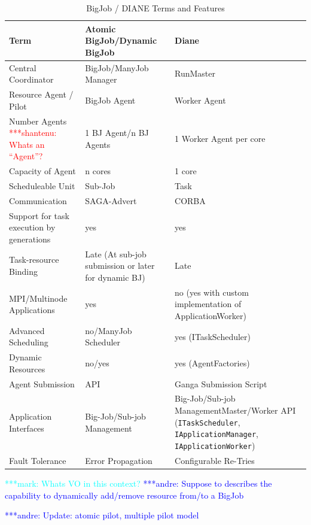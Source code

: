 \documentclass[conference,final]{IEEEtran}
\newcommand{\jhanote}[1]{ {\textcolor{red} { ***shantenu: #1 }}}
\newcommand{\alnote}[1]{ {\textcolor{blue} { ***andre: #1 }}}
\newcommand{\msnote}[1]{ {\textcolor{cyan} { ***mark: #1 }}}
\newcommand{\alnote}[1]{}
\newcommand{\jhanote}[1]{}
\begin{document}
\begin{table}[t]
\centering
\begin{tabular}{|p{3.5cm}|p{5.9cm}|p{5.7cm}|}
\hline
\textbf{Term} &\textbf{Atomic BigJob/Dynamic BigJob} &\textbf{Diane}  \\
\hline
Central Coordinator &BigJob/ManyJob Manager & RunMaster \\ 
\hline
Resource Agent / Pilot &BigJob Agent  & Worker Agent \\
\hline
Number Agents \jhanote{Whats an ``Agent''?}  &1 BJ Agent/n BJ Agents & 1 Worker Agent per core \\
\hline
Capacity of Agent &n cores & 1 core\\
\hline
Scheduleable Unit&Sub-Job &  Task \\
\hline
Communication &SAGA-Advert & CORBA\\
\hline
Support for task execution by generations  &yes &yes\\  
\hline
Task-resource Binding &Late (At sub-job submission or later for dynamic BJ) &Late\\
\hline
MPI/Multinode Applications &yes &no (yes with custom implementation of ApplicationWorker)\\
\hline
Advanced Scheduling &no/ManyJob Scheduler &yes (ITaskScheduler)\\
\hline
Dynamic Resources &no/yes &yes (AgentFactories)\\
\hline
Agent Submission &API &Ganga Submission Script\\
\hline
Application Interfaces &Big-Job/Sub-job Management &Big-Job/Sub-job 
Management\linebreak[4] Master/Worker API (\texttt{ITaskScheduler}, 
\texttt{IApplicationManager}, \texttt{IApplicationWorker}) \\
\hline
Fault Tolerance &Error Propagation &Configurable Re-Tries\\
\hline
\end{tabular}
\caption{BigJob / DIANE Terms and Features}
\end{table}

\msnote{Whats VO in this context?}\alnote{Suppose to describes the capability to dynamically add/remove resource from/to a BigJob}


\alnote{Update: atomic pilot, multiple pilot model}


\end{document}

